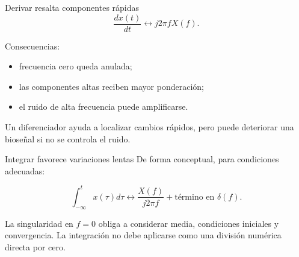 \documentclass[
  ignorenonframetext,
  aspectratio=169,
  spanish,
]{beamer}
\providecommand{\tightlist}{%
  \setlength{\itemsep}{0pt}\setlength{\parskip}{0pt}}
\begin{document}
\begin{frame}{Derivar resalta componentes rápidas}
  \protect{}\label{derivar-resalta-componentes-ruxe1pidas}
  \[\frac{dx(t)}{dt}\longleftrightarrow j2\pi fX(f).\]

  Consecuencias:

  \begin{itemize}
    \tightlist
    \item
          frecuencia cero queda anulada;
    \item
          las componentes altas reciben mayor ponderación;
    \item
          el ruido de alta frecuencia puede amplificarse.
  \end{itemize}

  \begin{tcolorbox}[enhanced jigsaw, arc=.35mm, bottomrule=.15mm, bottomtitle=1mm, breakable, colback=white, colbacktitle=quarto-callout-warning-color!10!white, colframe=quarto-callout-warning-color-frame, coltitle=black, left=2mm, leftrule=.75mm, opacityback=0, opacitybacktitle=0.6, rightrule=.15mm, title=\textcolor{quarto-callout-warning-color}{\faExclamationTriangle}\hspace{0.5em}{Advertencia}, titlerule=0mm, toprule=.15mm, toptitle=1mm]

    Un diferenciador ayuda a localizar cambios rápidos, pero puede
    deteriorar una bioseñal si no se controla el ruido.

  \end{tcolorbox}
\end{frame}

\begin{frame}{Integrar favorece variaciones lentas}
  \protect{}\label{integrar-favorece-variaciones-lentas}
  De forma conceptual, para condiciones adecuadas:

  \[\int_{-\infty}^{t}x(\tau)d\tau
    \longleftrightarrow \frac{X(f)}{j2\pi f}+\text{término en }\delta(f).\]

  \begin{tcolorbox}[enhanced jigsaw, arc=.35mm, bottomrule=.15mm, bottomtitle=1mm, breakable, colback=white, colbacktitle=quarto-callout-note-color!10!white, colframe=quarto-callout-note-color-frame, coltitle=black, left=2mm, leftrule=.75mm, opacityback=0, opacitybacktitle=0.6, rightrule=.15mm, title=\textcolor{quarto-callout-note-color}{\faInfo}\hspace{0.5em}{Nota}, titlerule=0mm, toprule=.15mm, toptitle=1mm]

    La singularidad en \(f=0\) obliga a considerar media, condiciones
    iniciales y convergencia. La integración no debe aplicarse como una
    división numérica directa por cero.

  \end{tcolorbox}
\end{frame}
\end{document}
